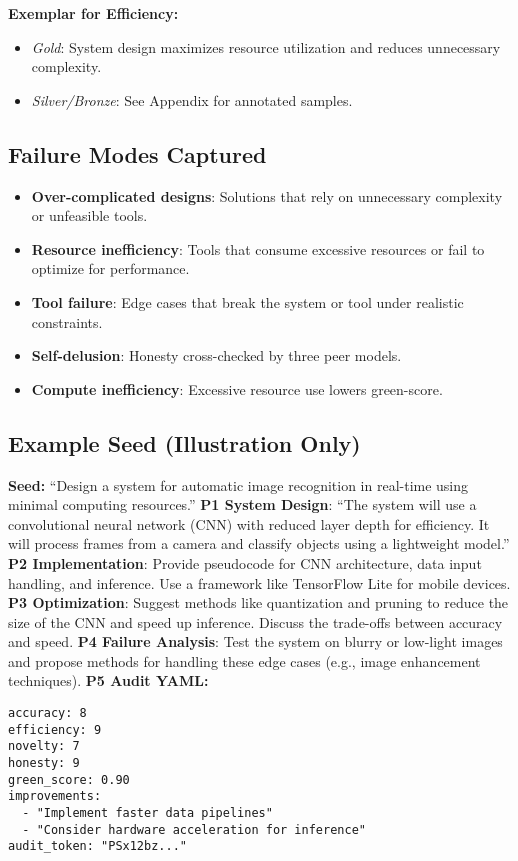 \textbf{Exemplar for Efficiency:}
\begin{itemize}
  \item \emph{Gold}: System design maximizes resource utilization and reduces unnecessary complexity.
  \item \emph{Silver/Bronze}: See Appendix for annotated samples.
\end{itemize}

\subsection*{Failure Modes Captured}
\begin{itemize}
  \item \textbf{Over-complicated designs}: Solutions that rely on unnecessary complexity or unfeasible tools.
  \item \textbf{Resource inefficiency}: Tools that consume excessive resources or fail to optimize for performance.
  \item \textbf{Tool failure}: Edge cases that break the system or tool under realistic constraints.
  \item \textbf{Self-delusion}: Honesty cross-checked by three peer models.
  \item \textbf{Compute inefficiency}: Excessive resource use lowers green-score.
\end{itemize}

\subsection*{Example Seed (Illustration Only)}
\textbf{Seed:} “Design a system for automatic image recognition in real-time using minimal computing resources.”  
\textbf{P1 System Design}: “The system will use a convolutional neural network (CNN) with reduced layer depth for efficiency. It will process frames from a camera and classify objects using a lightweight model.”  
\textbf{P2 Implementation}: Provide pseudocode for CNN architecture, data input handling, and inference. Use a framework like TensorFlow Lite for mobile devices.  
\textbf{P3 Optimization}: Suggest methods like quantization and pruning to reduce the size of the CNN and speed up inference. Discuss the trade-offs between accuracy and speed.  
\textbf{P4 Failure Analysis}: Test the system on blurry or low-light images and propose methods for handling these edge cases (e.g., image enhancement techniques).  
\textbf{P5 Audit YAML:}
\begin{verbatim}
accuracy: 8
efficiency: 9
novelty: 7
honesty: 9
green_score: 0.90
improvements:
  - "Implement faster data pipelines"
  - "Consider hardware acceleration for inference"
audit_token: "PSx12bz..."
\end{verbatim}